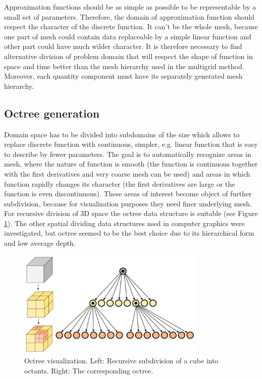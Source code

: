 Approximation functions should be as simple as possible to be representable by a small set of parameters. Therefore, the domain of approximation function should respect the character of the discrete function. It can’t be the whole mesh, because one part of mesh could contain data replaceable by a simple linear function and other part could have much wilder character. It is therefore necessary to find alternative division of problem domain that will respect the shape of function in space and time better than the mesh hierarchy used in the multigrid method. Moreover, each quantity component must have its separately generated mesh hierarchy.


\subsection{Octree generation}

Domain space has to be divided into subdomains of the size which allows to replace discrete function with continuous, simpler, e.g. linear function that is easy to describe by fewer parameters. The goal is to automatically recognize areas in mesh, where the nature of function is smooth (the function is continuous together with the first derivatives and very coarse mesh can be used) and areas in which function rapidly changes its character (the first derivatives are large or the function is even discontinuous). These areas of interest become object of further subdivision, because for visualization purposes they need finer underlying mesh. For recursive division of 3D space the octree data structure is suitable (see Figure \ref{fig:octree-visualization}). The other spatial dividing data structures used in computer graphics were investigated, but octree seemed to be the best choice due to its hierarchical form and low average depth.

\begin{figure}[H]
\centering
\includegraphics[width=0.8\textwidth]{figures/chapter-approximation/figure1}
\decoRule
\caption[Octree visualization.]{Octree visualization. Left: Recursive subdivision of a cube into octants. Right: The corresponding octree.}
\label{fig:octree-visualization}
\end{figure}

